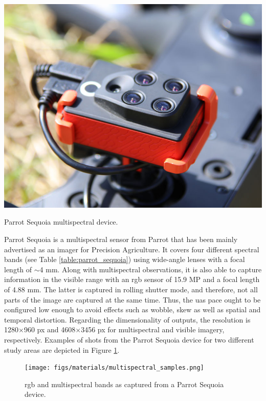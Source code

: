 \begin{marginfigure}[.2cm]
	\includegraphics{figs/materials/sequoia_parrot.jpg}
	\caption{Parrot Sequoia multispectral device.}
	\label{fig:parrot_sequoia}
\end{marginfigure}
Parrot Sequoia is a multispectral sensor from Parrot that has been mainly advertised as an imager for Precision Agriculture. It covers four different spectral bands (see Table \ref{table:parrot_sequoia}) using wide-angle lenses with a focal length of $\sim$4 \si{\milli\meter}. Along with multispectral observations, it is also able to capture information in the visible range with an \acrshort{rgb} sensor of 15.9 MP and a focal length of 4.88 \si{\milli\meter}. The latter is captured in rolling shutter mode, and therefore, not all parts of the image are captured at the same time. Thus, the \acrshort{uas} pace ought to be configured low enough to avoid effects such as wobble, skew as well as spatial and temporal distortion. Regarding the dimensionality of outputs, the resolution is 1280$\times$960 px and 4608$\times$3456 px for multispectral and visible imagery, respectively. Examples of shots from the Parrot Sequoia device for two different study areas are depicted in Figure \ref{fig:multispectral_samples}. 

\begin{figure}[ht]
	\texttt{[image: figs/materials/multispectral\_samples.png]}
	\caption{\acrshort{rgb} and multispectral bands as captured from a Parrot Sequoia device.}
	\label{fig:multispectral_samples}
\end{figure}

